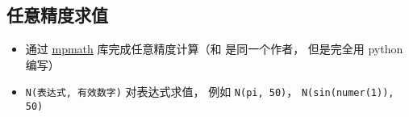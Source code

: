 \subsection{任意精度求值}
\begin{itemize}
\item 通过 \href{https://mpmath.org/}{mpmath} 库完成任意精度计算（和  是同一个作者， 但是完全用 python 编写）
\item \verb`N(表达式, 有效数字)` 对表达式求值， 例如 \verb`N(pi, 50)`， \verb`N(sin(numer(1)), 50)`
\end{itemize}

